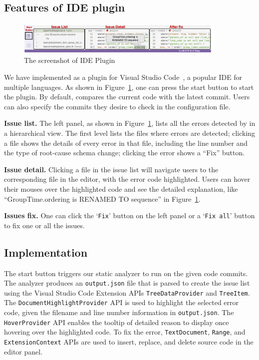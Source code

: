 \subsection{Features of \Tool{} IDE plugin}

\begin{figure}
\centering
\includegraphics[width=0.9\textwidth]{figs/plugin.png}
\caption{The screenshot of \Tool{} IDE Plugin}
\label{fig:vscode-plugin}
\end{figure}


We have implemented \Tool{} as a plugin for Visual Studio Code~\cite{vscode}, a popular IDE for multiple languages.
As shown in Figure~\ref{fig:vscode-plugin}, one can press the start button to start the plugin. By default, \Tool compares the current code with the latest commit.
Users can also specify the commits they desire to check in the configuration file. 

\textbf{Issue list.} The left panel, as shown in Figure~\ref{fig:vscode-plugin}, lists all the errors detected by \Tool in a hierarchical view. The first level lists
the files where errors are detected; clicking a file shows the details of every 
error in that file, including the line number and the type of root-cause schema change;
clicking the error shows a ``Fix'' button. 

\textbf{Issue detail.} Clicking a file in the issue list will navigate users to the corresponding file in the editor, with the error code highlighted. Users can hover their mouses over the highlighted code and see the detailed
explanation, like ``GroupTime.ordering is RENAMED TO sequence'' in Figure~\ref{fig:vscode-plugin}. 

\textbf{Issues fix.} One can click the  `\texttt{Fix}'  button  on the left panel
or a `\texttt{Fix all}' button to fix one or all the issues.


\subsection{Implementation}
The start button triggers our static analyzer to run on the given
code commits. The analyzer produces an \texttt{output.json} file that is parsed 
to create the issue list using  the Visual Studio Code Extension APIs \texttt{TreeDataProvider} and \texttt{TreeItem}. 
The \texttt{DocumentHighlightProvider} API is used to highlight the selected error code, given the filename and line number information in 
\texttt{output.json}. The \texttt{HoverProvider} API enables the tooltip of detailed reason to  display once hovering over the highlighted code.
To fix the error, \texttt{TextDocument}, \texttt{Range}, and  \texttt{ExtensionContext} APIs are used to insert, replace, and delete source code in the editor panel.




